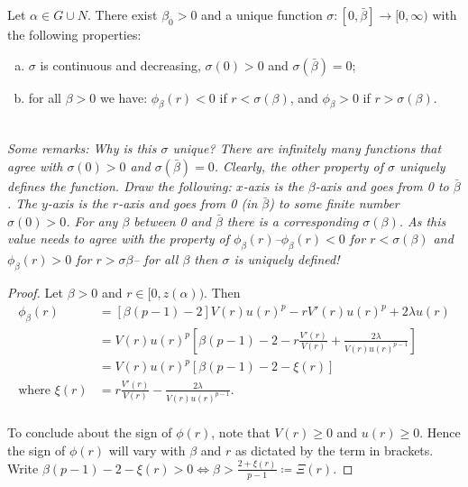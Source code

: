 \newpage
\begin{lemma}Let $\alpha\in G\cup N$. There exist $\beta_0>0$ and a unique function $\sigma:[0,\bar\beta]\to[0,\infty)$ with the following properties: \begin{enumerate}[(a)]
	\item  $\sigma$ is continuous and decreasing, $\sigma(0)>0$ and $\sigma(\bar\beta)=0$;
    \item for all $\beta>0$ we have: $\phi_\beta(r)<0$ if $r<\sigma(\beta)$, and $\phi_\beta>0$ if $r>\sigma(\beta)$.
\end{enumerate}
\emph{}\\[11pt]\emph{Some remarks: Why is this $\sigma$ unique? There are infinitely many functions that agree with $\sigma(0)>0$ and $\sigma(\bar{\beta})=0$. Clearly, the other property of $\sigma$ uniquely defines the function. Draw the following: $x$-axis is the $\beta$-axis and goes from 0 to $\bar{\beta}$. The $y$-axis is the $r$-axis and goes from 0 (in $\bar{\beta}$) to some finite number $\sigma(0)>0$. For any $\beta$ between 0 and $\bar{\beta}$ there is a corresponding $\sigma(\beta)$. As this value needs to agree with the property of $\phi_{\beta}(r)$--$\phi_{\beta}(r)<0$ for $r<\sigma(\beta)$ and $\phi_{\beta}(r)>0$ for $r>\sigma{\beta}$-- for all $\beta$ then $\sigma$ is uniquely defined!}\\[11pt]


\begin{proof}
Let $\beta>0$ and $r\in[0,z(\alpha))$. Then \begin{align*}
\phi_{\beta}(r)&=\left[\beta(p-1)-2\right]V(r)u(r)^p-rV'(r)u(r)^p+2\lambda u(r) %
\\ &=V(r)u(r)^p\left[\beta(p-1)-2-r\frac{V'(r)}{V(r)}+\frac{2\lambda}{V(r)u(r)^{p-1}}\right]
\\ &= V(r)u(r)^p\left[\beta(p-1)-2-\xi(r)\right]
\\\text{where }\xi(r)&=r\frac{V'(r)}{V(r)}-\frac{2\lambda}{V(r)u(r)^{p-1}}.
\end{align*}
\\
To conclude about the sign of $\phi(r)$, note that $V(r)\geq0$ and $u(r)\geq0$. Hence the sign of $\phi(r)$ will vary with $\beta$ and $r$ as dictated by the term in brackets. Write $\beta(p-1)-2-\xi(r)>0\iff\beta>\frac{2+\xi(r)}{p-1}\coloneqq\Xi(r)$.


\end{proof}
\end{lemma}
